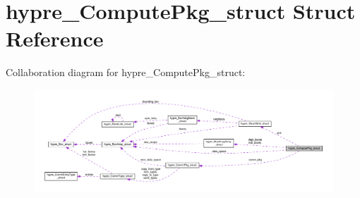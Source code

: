 \hypertarget{structhypre__ComputePkg__struct}{}\section{hypre\+\_\+\+Compute\+Pkg\+\_\+struct Struct Reference}
\label{structhypre__ComputePkg__struct}


Collaboration diagram for hypre\+\_\+\+Compute\+Pkg\+\_\+struct\+:
\nopagebreak
\begin{figure}[H]
\begin{center}
\leavevmode
\includegraphics[width=350pt]{structhypre__ComputePkg__struct__coll__graph}
\end{center}
\end{figure}
